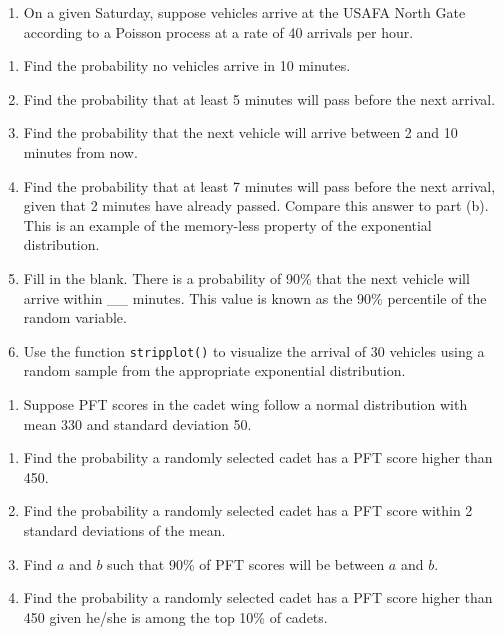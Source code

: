 \documentclass[
  letterpaper,
  DIV=11,
  numbers=noendperiod]{scrreprt}
\providecommand{\tightlist}{%
  \setlength{\itemsep}{0pt}\setlength{\parskip}{0pt}}\usepackage{longtable,booktabs,array}
\begin{document}
\begin{enumerate}
\def\labelenumi{\arabic{enumi}.}
\tightlist
\item
  On a given Saturday, suppose vehicles arrive at the USAFA North Gate
  according to a Poisson process at a rate of 40 arrivals per hour.
\end{enumerate}

\begin{enumerate}
\def\labelenumi{\alph{enumi}.}
\tightlist
\item
  Find the probability no vehicles arrive in 10 minutes.\\
\item
  Find the probability that at least 5 minutes will pass before the next
  arrival.\\
\item
  Find the probability that the next vehicle will arrive between 2 and
  10 minutes from now.\\
\item
  Find the probability that at least 7 minutes will pass before the next
  arrival, given that 2 minutes have already passed. Compare this answer
  to part (b). This is an example of the memory-less property of the
  exponential distribution.\\
\item
  Fill in the blank. There is a probability of 90\% that the next
  vehicle will arrive within \_\_ minutes. This value is known as the
  90\% percentile of the random variable.\\
\item
  Use the function \texttt{stripplot()} to visualize the arrival of 30
  vehicles using a random sample from the appropriate exponential
  distribution.
\end{enumerate}

\begin{enumerate}
\def\labelenumi{\arabic{enumi}.}
\setcounter{enumi}{1}
\tightlist
\item
  Suppose PFT scores in the cadet wing follow a normal distribution with
  mean 330 and standard deviation 50.
\end{enumerate}

\begin{enumerate}
\def\labelenumi{\alph{enumi}.}
\tightlist
\item
  Find the probability a randomly selected cadet has a PFT score higher
  than 450.\\
\item
  Find the probability a randomly selected cadet has a PFT score within
  2 standard deviations of the mean.\\
\item
  Find \(a\) and \(b\) such that 90\% of PFT scores will be between
  \(a\) and \(b\).\\
\item
  Find the probability a randomly selected cadet has a PFT score higher
  than 450 given he/she is among the top 10\% of cadets.
\end{enumerate}
\end{document}

